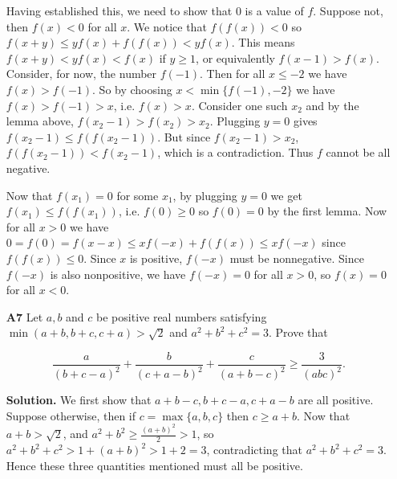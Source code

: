 \documentclass[11pt,a4paper]{article}
\begin{document}
\begin{enumerate}
	Having established this, we need to show that 0 is a value of $f$. Suppose not, then $f(x)<0$ for all $x$. 
	We notice that $f(f(x))< 0$ so $f(x+y)\le yf(x)+f(f(x))< yf(x)$. 
	This means $f(x+y)<yf(x)<f(x)$ if $y\ge 1$, or equivalently $f(x-1)>f(x)$. Consider, for now, the number $f(-1)$. Then for all $x\le -2$ we have $f(x)>f(-1)$. So by choosing $x<\min\{f(-1), -2\}$ we have $f(x)>f(-1)>x$, i.e. $f(x)>x$. 
	Consider one such $x_2$ and by the lemma above, $f(x_2-1)>f(x_2)>x_2$. 
	Plugging $y=0$ gives $f(x_2-1)\le f(f(x_2-1))$. But since $f(x_2-1)>x_2$, $f(f(x_2-1))<f(x_2-1)$, which is a contradiction. Thus $f$ cannot be all negative. 
	
	Now that $f(x_1)=0$ for some $x_1$, by plugging $y=0$ we get $f(x_1)\le f(f(x_1))$, i.e. $f(0)\ge 0$ so $f(0)=0$ by the first lemma. Now for all $x>0$ we have $0=f(0)=f(x-x)\le xf(-x)+f(f(x))\le xf(-x)$ since $f(f(x))\le 0$. Since $x$ is positive, $f(-x)$ must be nonnegative. Since $f(-x)$ is also nonpositive, we have $f(-x)=0$ for all $x>0$, so $f(x)=0$ for all $x<0$. 
	
	\item [\textbf{A7}] Let $a,b$ and $c$ be positive real numbers satisfying $\min(a+b,b+c,c+a) > \sqrt{2}$ and $a^2+b^2+c^2=3.$ Prove that
	
	\[\frac{a}{(b+c-a)^2} + \frac{b}{(c+a-b)^2} + \frac{c}{(a+b-c)^2} \geq \frac{3}{(abc)^2}.\]
	
	\textbf{Solution.} We first show that $a+b-c, b+c-a, c+a-b$ are all positive. Suppose otherwise, then if $c=\max\{a, b, c\}$ then $c\ge a+b$. Now that $a+b>\sqrt{2}$, and $a^2+b^2\ge \frac{(a+b)^2}{2}>1$, so $a^2+b^2+c^2>1+(a+b)^2>1+2=3$, contradicting that $a^2+b^2+c^2=3$. Hence these three quantities mentioned must all be positive. 
	

\end{enumerate}
\end{document}
